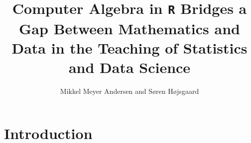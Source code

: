 \title{Computer Algebra in \texttt{R} Bridges a Gap Between Mathematics and Data in the Teaching of Statistics and Data Science}
\author{Mikkel Meyer Andersen and Søren Højsgaard}


\maketitle


\address{%
Mikkel Meyer Andersen\\
Department of Mathematical Sciences, Aalborg University, Denmark\\%
Skjernvej 4A\\ 9220 Aalborg Ø, Denmark\\
%
%
\textit{ORCiD: \href{https://orcid.org/0000-0002-0234-0266}{0000-0002-0234-0266}}\\%
\href{mailto:mikl@math.aau.dk}{\nolinkurl{mikl@math.aau.dk}}%
}

\address{%
Søren Højsgaard\\
Department of Mathematical Sciences, Aalborg University, Denmark\\%
Skjernvej 4A\\ 9220 Aalborg Ø, Denmark\\
%
%
\textit{ORCiD: \href{https://orcid.org/0000-0002-3269-9552}{0000-0002-3269-9552}}\\%
\href{mailto:sorenh@math.aau.dk}{\nolinkurl{sorenh@math.aau.dk}}%
}



\hypertarget{introduction}{%
\section{Introduction}\label{introduction}}

